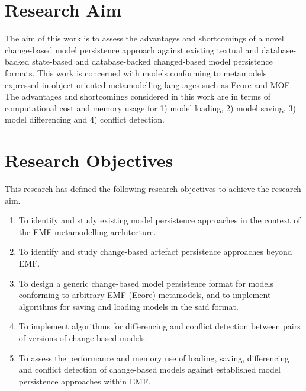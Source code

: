 \section{Research Aim}
\label{sec:research_aim}
The aim of this work is to assess the advantages and shortcomings of a novel change-based model persistence approach against existing textual and database-backed state-based and database-backed changed-based model persistence formats. This work is concerned with models conforming to metamodels expressed in object-oriented metamodelling languages such as Ecore and MOF. The advantages and shortcomings considered in this work are in terms of computational cost and memory usage for 1) model loading, 2) model saving, 3) model differencing and 4) conflict detection.

\section{Research Objectives}
\label{sec:research_objectives}
This research has defined the following research objectives to achieve the research aim.
\begin{enumerate}
\item To identify and study existing model persistence approaches in the context of the EMF metamodelling architecture.
\item To identify and study change-based artefact persistence approaches beyond EMF.
\item To design a generic change-based model persistence format for models conforming to arbitrary EMF (Ecore) metamodels, and to implement algorithms for saving and loading models in the said format.
\item To implement algorithms for differencing and conflict detection between pairs of versions of change-based models.
\item To assess the performance and memory use of loading, saving, differencing and conflict detection of change-based models against established model persistence approaches within EMF.
\end{enumerate}


